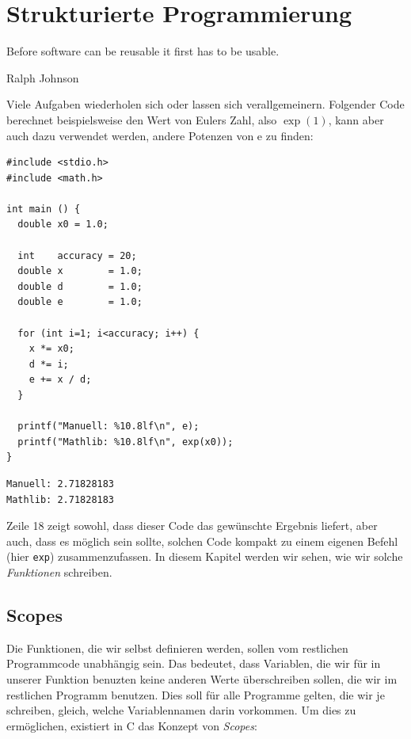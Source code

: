 \chapter{Strukturierte Programmierung} \label{chp:funcs}
\epigraph{Before software can be reusable it first has to be usable.}{Ralph Johnson}

Viele Aufgaben wiederholen sich oder lassen sich verallgemeinern. Folgender Code berechnet beispielsweise den Wert von Eulers Zahl, also $\exp(1)$, kann aber auch dazu verwendet werden, andere Potenzen von e zu finden:

\begin{codebox}
\begin{verbatim}
#include <stdio.h>
#include <math.h>

int main () {
  double x0 = 1.0;
  
  int    accuracy = 20;
  double x        = 1.0;
  double d        = 1.0;
  double e        = 1.0;
  
  for (int i=1; i<accuracy; i++) {
    x *= x0;
    d *= i;
    e += x / d;
  }
  
  printf("Manuell: %10.8lf\n", e);
  printf("Mathlib: %10.8lf\n", exp(x0));
}
\end{verbatim}
\end{codebox}

\begin{cmdbox}
\begin{verbatim}
Manuell: 2.71828183
Mathlib: 2.71828183
\end{verbatim}
\end{cmdbox}

Zeile 18 zeigt sowohl, dass dieser Code das gewünschte Ergebnis liefert, aber auch, dass es möglich sein sollte, solchen Code kompakt zu einem eigenen Befehl (hier \texttt{exp}) zusammenzufassen. In diesem Kapitel werden wir sehen, wie wir solche \emph{Funktionen} schreiben.

\section{Scopes} \label{sec:Scopes}
Die Funktionen, die wir selbst definieren werden, sollen vom restlichen Programmcode unabhängig sein. Das bedeutet, dass Variablen, die wir für in unserer Funktion benuzten keine anderen Werte überschreiben sollen, die wir im restlichen Programm benutzen. Dies soll für alle Programme gelten, die wir je schreiben, gleich, welche Variablennamen darin vorkommen. Um dies zu ermöglichen, existiert in C das Konzept von \emph{Scopes}:

